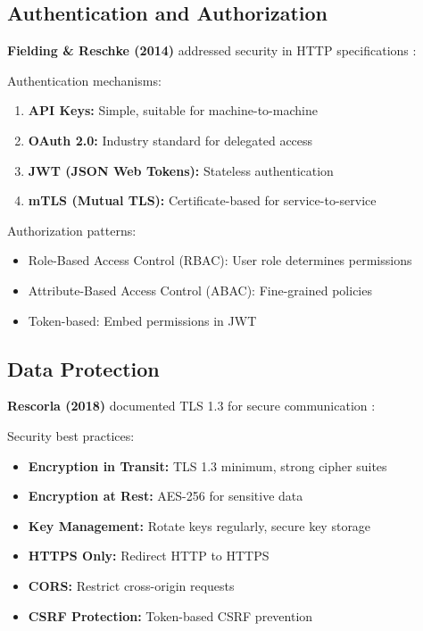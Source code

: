 \documentclass[conference]{IEEEtran}
\begin{document}
\begin{enumerate}
\subsection{Authentication and Authorization}

\textbf{Fielding \& Reschke (2014)} addressed security in HTTP specifications \cite{fielding2014http}:

Authentication mechanisms:
\begin{enumerate}
    \item \textbf{API Keys:} Simple, suitable for machine-to-machine
    \item \textbf{OAuth 2.0:} Industry standard for delegated access
    \item \textbf{JWT (JSON Web Tokens):} Stateless authentication
    \item \textbf{mTLS (Mutual TLS):} Certificate-based for service-to-service
\end{enumerate}

Authorization patterns:
\begin{itemize}
    \item Role-Based Access Control (RBAC): User role determines permissions
    \item Attribute-Based Access Control (ABAC): Fine-grained policies
    \item Token-based: Embed permissions in JWT
\end{itemize}

\subsection{Data Protection}

\textbf{Rescorla (2018)} documented TLS 1.3 for secure communication \cite{rescorla2018tls}:

Security best practices:
\begin{itemize}
    \item \textbf{Encryption in Transit:} TLS 1.3 minimum, strong cipher suites
    \item \textbf{Encryption at Rest:} AES-256 for sensitive data
    \item \textbf{Key Management:} Rotate keys regularly, secure key storage
    \item \textbf{HTTPS Only:} Redirect HTTP to HTTPS
    \item \textbf{CORS:} Restrict cross-origin requests
    \item \textbf{CSRF Protection:} Token-based CSRF prevention
\end{itemize}


\end{enumerate}
\end{document}
